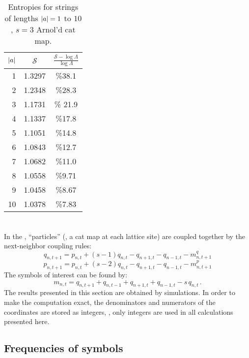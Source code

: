 \begin{table}
\begin{center}
\begin{tabular}{ r|c|c}
 ${|a|}$& $\mathcal{S}$& $\frac{ \mathcal{S}-\log \Lambda }{\log \Lambda}$\\
   \hline
1& 1.3297 & \%38.1 \\
 2 &  1.2348 &  \%28.3\\
 3 & 1.1731 &\% 21.9\\
 4 & 1.1337 & \%17.8 \\
 5& 1.1051 &\%14.8 \\
 6& 1.0843 &\%12.7 \\
 7& 1.0682 &\%11.0\\
 8& 1.0558 & \%9.71\\
 9& 1.0458 &\%8.67 \\
 10& 1.0378 &\%7.83 \\
\end{tabular}
\end{center}
  \caption{\label{tab:RJentropies}
Entropies  for strings of lengths
${|a|} = 1$ to $10$, $s = 3$ Arnol'd cat map.
  }
\end{table}


\section{{\catLatt}}
\label{sect:RJCouplCatMaps}

In the {\catlatt}, ``particles'' (\ie, a cat map at each lattice site)
are coupled together by the next-neighbor coupling rules:
\[
q_{n, t+1}=p_{n,t}+(s-1)q_{n,t} - q_{n+1,t} - q_{n-1,t} - {m}^q_{n,t+1}
\]
\[
p_{n,t+1}= p_{n,t} + (s-2) q_{n,t} - q_{n+1,t} - q_{n-1,t} - {m}^p_{n,t+1}
\]
The symbols of interest can be found by:
\[
m_{n,t} = q_{n,t+1} + q_{n,t-1} + q_{n+1,t} + q_{n-1, t} -  s \, q_{n,t}
\,.
\]
The results presented in this section are obtained by simulations. In
order to make the computation exact, the denominators and numerators of
the coordinates are stored as integers, \ie, only integers are used in all
calculations presented here.

\subsection{Frequencies of symbols}

